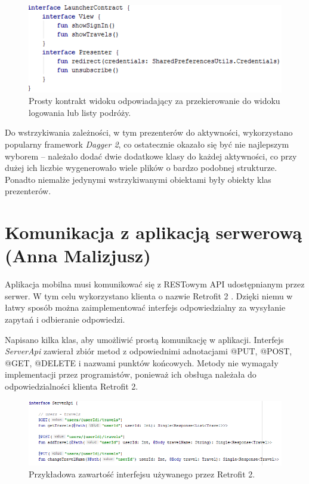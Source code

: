 \documentclass[10pt,twoside,a4paper]{report}
\begin{document}
\begin{figure}[h]
\centering
\includegraphics[width=\linewidth]{launcherContract}
\caption{Prosty kontrakt widoku odpowiadający za przekierowanie do widoku logowania lub listy podróży.}
\label{fig:launcherContract}
\end{figure}
\FloatBarrier

\par Do wstrzykiwania zależności, w tym prezenterów do aktywności, wykorzystano popularny framework \textit{Dagger 2}\cite{Dagger 2}, co ostatecznie okazało się być nie najlepszym wyborem – należało dodać dwie dodatkowe klasy do każdej aktywności, co przy dużej ich liczbie wygenerowało wiele plików o bardzo podobnej strukturze. Ponadto niemalże jedynymi wstrzykiwanymi obiektami były obiekty klas prezenterów. 

\section{Komunikacja z aplikacją serwerową (Anna Malizjusz)}
\par Aplikacja mobilna musi komunikować się z RESTowym API udostępnianym przez serwer. W tym celu wykorzystano klienta o nazwie Retrofit 2 \cite{Retrofit library}. Dzięki niemu w łatwy sposób można zaimplementować interfejs odpowiedzialny za wysyłanie zapytań i odbieranie odpowiedzi.

\par Napisano kilka klas, aby umożliwić prostą komunikację w aplikacji. Interfejs \textit{ServerApi} zawierał zbiór metod z odpowiednimi adnotacjami @PUT, @POST, @GET, @DELETE i nazwami punktów końcowych. Metody nie wymagały implementacji przez programistów, ponieważ ich obsługa należała do odpowiedzialności klienta Retrofit 2.

\begin{figure}[h]
\centering
\includegraphics[width=\linewidth]{serverApi}
\caption{Przykładowa zawartość interfejsu używanego przez Retrofit 2.}
\label{fig:tokenPayload}
\end{figure}
\FloatBarrier
\end{document}
